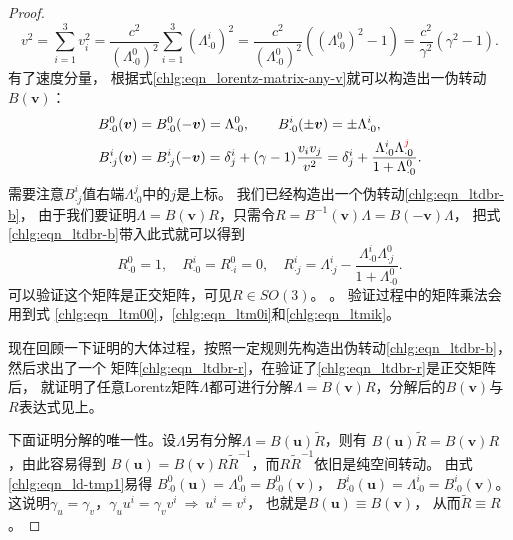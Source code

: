 \begin{proof}
    \begin{equation}\label{chlg:eqn_ltdbr-v}
        v^2 = \sum_{i=1}^{3}v_i^2 =  \dfrac{c^2}{(\Lambda^0_{\cdot 0})^2} \sum_{i=1}^{3}
        ({\Lambda^i_{\cdot 0}})^2
        = \dfrac{c^2}{(\Lambda^0_{\cdot 0})^2}\left(  (\Lambda^0_{\cdot 0})^2 -1\right)
        = \dfrac{c^2}{\gamma^2}\left(  \gamma^2 -1\right).
    \end{equation}
    有了速度分量，
    根据式\eqref{chlg:eqn_lorentz-matrix-any-v}就可以构造出一伪转动$B(\boldsymbol{v})$：
    \begin{equation}\label{chlg:eqn_ltdbr-b}
        \begin{aligned}
            B^{0}_{\cdot 0}(\boldsymbol{v}) &= B^{0}_{\cdot 0}(-\boldsymbol{v}) =  \Lambda ^{0}_{\cdot 0}, \qquad
            B^{i}_{\cdot 0}(\pm\boldsymbol{v}) = \pm \Lambda ^{i}_{\cdot 0}, \\
            B^{i}_{\cdot j}(\boldsymbol{v}) &= B^{i}_{\cdot j}(-\boldsymbol{v}) =
            \delta^i_j + (\gamma-1)\dfrac{v_i v_j}{v^2} =
            \delta^i_j + \dfrac{\Lambda ^{i}_{\cdot 0}\Lambda ^{{\color{red}j}}_{\cdot 0}}
            {1 + \Lambda ^{0}_{\cdot 0} } .
        \end{aligned}
    \end{equation}
    需要注意$B^{i}_{\cdot j}$值右端$\Lambda ^{j}_{\cdot 0}$中的$j$是上标。
    我们已经构造出一个伪转动\eqref{chlg:eqn_ltdbr-b}，
    由于我们要证明$\Lambda=B(\boldsymbol{v})R$，只需令$R =B^{-1}(\boldsymbol{v})\Lambda=B(-\boldsymbol{v})\Lambda $，
    把式\eqref{chlg:eqn_ltdbr-b}带入此式就可以得到
    \begin{equation}\label{chlg:eqn_ltdbr-r}
        R^{0}_{\cdot 0} = 1, \quad    R^{i}_{\cdot 0} = R^{0}_{\cdot i} = 0, \quad
        R^{i}_{\cdot j} = \Lambda^i_{\cdot j} - \dfrac{\Lambda ^{i}_{\cdot 0}
            \Lambda ^{0}_{\cdot j}}{1 + \Lambda ^{0}_{\cdot 0} }.
    \end{equation}
    可以验证这个矩阵是正交矩阵，可见$R\in SO(3)$。
    。
    验证过程中的矩阵乘法会用到式
    \eqref{chlg:eqn_ltm00}，\eqref{chlg:eqn_ltm0i}和\eqref{chlg:eqn_ltmik}。
    
    现在回顾一下证明的大体过程，按照一定规则先构造出伪转动\eqref{chlg:eqn_ltdbr-b}，然后求出了一个
    矩阵\eqref{chlg:eqn_ltdbr-r}，在验证了\eqref{chlg:eqn_ltdbr-r}是正交矩阵后，
    就证明了任意Lorentz矩阵$\Lambda$都可进行分解$\Lambda=B(\boldsymbol{v})R$，分解后的$B(\boldsymbol{v})$与$R$表达式见上。
    
    下面证明分解的唯一性。设$\Lambda$另有分解$\Lambda={B}(\boldsymbol{u})\tilde{R}$，则有
    ${B}(\boldsymbol{u})\tilde{R}=B(\boldsymbol{v})R$，由此容易得到
    ${B}(\boldsymbol{u})=B(\boldsymbol{v})R\tilde{R}^{-1}$，而$R\tilde{R}^{-1}$依旧是纯空间转动。
    由式\eqref{chlg:eqn_ld-tmp1}易得
    ${B}^{0}_{\cdot 0}(\boldsymbol{u})= \Lambda^0_{\cdot 0}=B^{0}_{\cdot 0}(\boldsymbol{v})$，
    ${B}^{i}_{\cdot 0}(\boldsymbol{u})= {\Lambda^i_{\cdot 0}} =B^{i}_{\cdot 0}(\boldsymbol{v})$。
    这说明$\gamma_u =\gamma_v$，$\gamma_u u^i=\gamma_v v^i{\  \Rightarrow \  } u^i=v^i$，
    也就是${B}(\boldsymbol{u}) \equiv B(\boldsymbol{v})$，    从而$\tilde{R}\equiv R$。
    

\end{proof}
